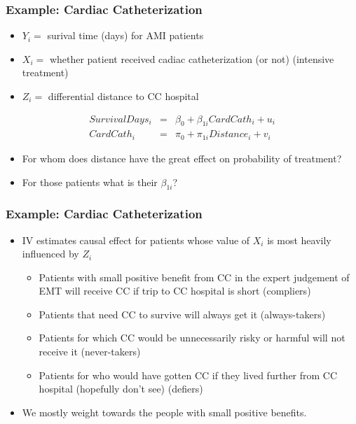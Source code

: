 \documentclass[xcolor=pdftex,dvipsnames,table,mathserif,aspectratio=169]{beamer}
\begin{document}
\begin{frame}
\frametitle{Example: Cardiac Catheterization}
\begin{itemize}
\item $Y_i=$ surival time (days) for AMI patients
\item $X_i=$ whether patient received cadiac catheterization (or not) (intensive treatment)
\item $Z_i=$ differential distance to CC hospital
\end{itemize}
\begin{eqnarray*}
SurvivalDays_i &=& \beta_0 + \beta_{1i} CardCath_i + u_i\\
CardCath_i &=& \pi_0 + \pi_{1i} Distance_i + v_i
\end{eqnarray*}
\begin{itemize}
\item For whom does distance have the great effect on probability of treatment?
\item For those patients what is their $\beta_{1i}$?
\end{itemize}
\end{frame}


\begin{frame}
\frametitle{Example: Cardiac Catheterization}
\begin{itemize}
\item IV estimates causal effect for patients whose value of $X_i$ is most heavily influenced by $Z_i$
\begin{itemize}
\item Patients with small positive benefit from CC in the expert judgement of EMT will receive CC if trip to CC hospital is short (\alert{compliers})
\item Patients that need CC to survive will always get it (\alert{always-takers})
\item Patients for which CC would be unnecessarily risky or harmful will not receive it (\alert{never-takers})
\item Patients for who would have gotten CC if they lived further from CC hospital (hopefully don't see) (\alert{defiers})
\end{itemize}
\item We mostly weight towards the people with small positive benefits.
\end{itemize}
\end{frame}
\end{document}

